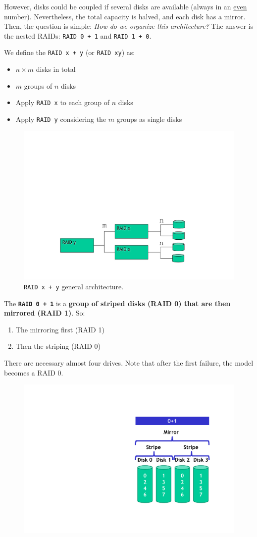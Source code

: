 \highspace
However, disks could be coupled if several disks are available (always in an \underline{even} number). Nevertheless, the total capacity is halved, and each disk has a mirror. Then, the question is simple: \emph{How do we organize this architecture?} The answer is the nested RAIDs: \texttt{RAID 0 + 1} and \texttt{RAID 1 + 0}.

\highspace
We define the \texttt{RAID x + y} (or \texttt{RAID xy}) as:
\begin{itemize}
    \item $n \times m$ disks in total
    \item $m$ groups of $n$ disks
    \item Apply \texttt{RAID x} to each group of $n$ disks
    \item Apply \texttt{RAID y} considering the $m$ groups as single disks
\end{itemize}
\newpage
\begin{figure}[!htp]
    \centering
    \includegraphics[width=.6\textwidth]{img/raid-2.pdf}
    \caption{\texttt{RAID x + y} general architecture.}
\end{figure}

\label{RAID 0 + 1}\noindent
The \hypertarget{RAID 0 + 1}{\texttt{\textbf{RAID 0 + 1}}} is a \textbf{group of striped disks (RAID 0) that are then mirrored (RAID 1)}. So:
\begin{enumerate}
    \item The mirroring first (RAID 1)
    \item Then the striping (RAID 0)
\end{enumerate}
There are necessary almost four drives. Note that after the first failure, the model becomes a RAID 0.
\begin{figure}[!htp]
    \centering
    \includegraphics[width=.5\textwidth]{img/raid-3.pdf}
\end{figure}

